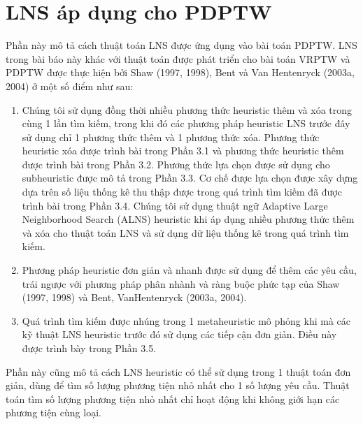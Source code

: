 
\chapter{LNS áp dụng cho PDPTW}
Phần này mô tả cách thuật toán LNS được ứng dụng vào bài toán PDPTW. LNS trong bài báo này khác với thuật toán được phát triển cho bài toán VRPTW và PDPTW được thực hiện bởi Shaw (1997, 1998), Bent và Van Hentenryck (2003a, 2004) ở một số điểm như sau:
\begin{enumerate}
    \item Chúng tôi sử dụng đồng thời nhiều phương thức heuristic thêm và xóa trong cùng 1 lần tìm kiếm, trong khi đó các phương pháp heuristic LNS trước đây sử dụng chỉ 1 phương thức thêm và 1 phương thức xóa. Phương thức heuristic xóa được trình bài trong Phần 3.1 và phương thức heuristic thêm được trình bài trong Phần 3.2. Phương thức lựa chọn được sử dụng cho subheuristic được mô tả trong Phần 3.3. Cơ chế được lựa chọn được xây dựng dựa trên số liệu thống kê thu thập được trong quá trình tìm kiếm đã được trình  bài trong Phần 3.4. Chúng tôi sử dụng thuật ngữ Adaptive Large Neighborhood Search (ALNS) heuristic khi áp dụng nhiều phương thức thêm và xóa cho thuật toán LNS và sử dụng dữ liệu thống kê trong quá trình tìm kiếm.
    \item Phương pháp heuristic đơn giản và nhanh được sử dụng để thêm các yêu cầu, trái ngược với phương pháp phân nhành và ràng buộc phức tạp của Shaw (1997, 1998) và Bent, VanHentenryck (2003a, 2004).
    \item Quá trình tìm kiếm được nhúng trong 1 metaheuristic mô phỏng khi mà các kỹ thuật LNS heuristic trước đó sử dụng các tiếp cận đơn giản. Điều này được trình bày trong Phần 3.5.
\end{enumerate}
Phần này cũng mô tả cách LNS heuristic có thể sử dụng trong 1 thuật toán đơn giản, dùng để tìm số lượng phương tiện nhỏ nhất cho 1 số lượng yêu cầu. Thuật toán tìm số lượng phương tiện nhỏ nhất chỉ hoạt động khi không giới hạn các phương tiện cùng loại.









